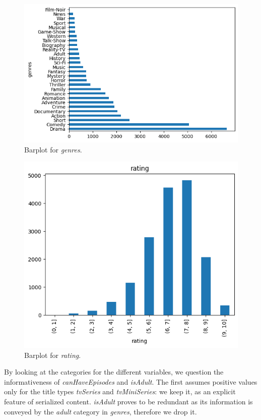 \begin{figure}
    \includegraphics[width=\columnwidth]{../results/images/barplot_genres.png}
    \caption{Barplot for \textit{genres}.}
    \label{fig:barplot_genres.png}
\end{figure}

\begin{figure}
    \includegraphics[width=\columnwidth]{../results/images/barplot_rating.png}
    \caption{Barplot for \textit{rating}.}
    \label{fig:barplot_rating.png}
\end{figure}

By looking at the categories for the different variables, we question the informativeness of \textit{canHaveEpisodes} and \textit{isAdult}. The first assumes positive values only for the title types \textit{tvSeries} and \textit{tvMiniSeries}:  we keep it, as an explicit feature of serialized content. \textit{isAdult} proves to be redundant as its information is conveyed by the \textit{adult} category in \textit{genres}, therefore we drop it.

